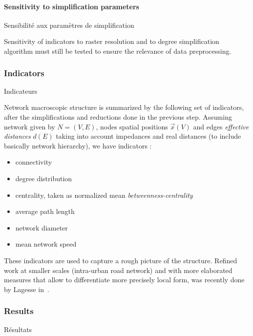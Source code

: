 \paragraph{Sensitivity to simplification parameters}{Sensibilité aux paramètres de simplification}

Sensitivity of indicators to raster resolution and to degree simplification algorithm must still be tested to ensure the relevance of data preprocessing.


\subsubsection{Indicators}{Indicateurs}

Network macroscopic structure is summarized by the following set of indicators, after the simplifications and reductions done in the previous step. Assuming network given by $N=(V,E)$, nodes spatial positions $\vec{x}(V)$ and edges \emph{effective distances} $d(E)$ taking into account impedances and real distances (to include basically network hierarchy), we have indicators :


\begin{itemize}
\item connectivity
\item degree distribution
\item centrality, taken as normalized mean \emph{betweenness-centrality}
\item average path length
\item network diameter
\item mean network speed
\end{itemize}

These indicators are used to capture a rough picture of the structure. Refined work at smaller scales (intra-urban road network) and with more elaborated measures that allow to differentiate more precisely local form, was recently done by Lagesse in~\cite{2015arXiv151201268L}.



\subsubsection{Results}{Résultats}









